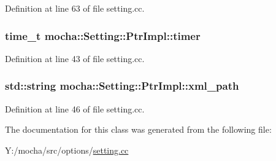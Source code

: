 Definition at line 63 of file setting.cc.

\hypertarget{classmocha_1_1_setting_1_1_ptr_impl_a28bf43280c03b9c9dd6b56ab088f8dbd}{
\subsubsection[{timer}]{\setlength{\rightskip}{0pt plus 5cm}time\_\-t {\bf mocha::Setting::PtrImpl::timer}}}
\label{classmocha_1_1_setting_1_1_ptr_impl_a28bf43280c03b9c9dd6b56ab088f8dbd}


Definition at line 43 of file setting.cc.

\hypertarget{classmocha_1_1_setting_1_1_ptr_impl_a5fddd4f897b994fe6a0144aa9f57c806}{
\subsubsection[{xml\_\-path}]{\setlength{\rightskip}{0pt plus 5cm}std::string {\bf mocha::Setting::PtrImpl::xml\_\-path}}}
\label{classmocha_1_1_setting_1_1_ptr_impl_a5fddd4f897b994fe6a0144aa9f57c806}


Definition at line 46 of file setting.cc.



The documentation for this class was generated from the following file:\begin{DoxyCompactItemize}
\item 
Y:/mocha/src/options/\hyperlink{setting_8cc}{setting.cc}\end{DoxyCompactItemize}
